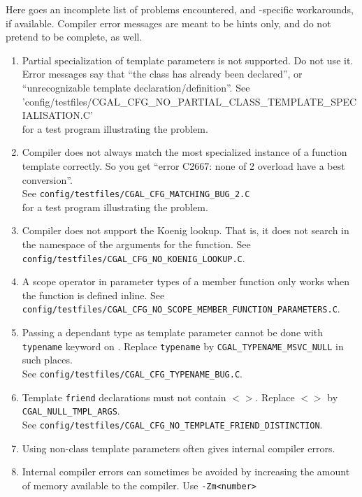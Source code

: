 Here goes an incomplete list of problems encountered, and
\cgal-specific workarounds, if available.  Compiler error messages are
meant to be hints only, and do not pretend to be complete, as well.
\begin{enumerate}
%
\item Partial specialization of template parameters is not
supported. Do not use it. Error messages say that ``the class has
already been declared'', or ``unrecognizable template
declaration/definition''. See
\nonlinkedpath'config/testfiles/CGAL_CFG_NO_PARTIAL_CLASS_TEMPLATE_SPECIALISATION.C'\\
 for a test program illustrating the problem. \label{msvc::parspec}
%
\item Compiler does not always match the most
specialized instance of a function template correctly. So you get
``error C2667: none of 2 overload have a best conversion''.\\
See \texttt{config/testfiles/CGAL\_CFG\_MATCHING\_BUG\_2.C} \\
for a test program illustrating the problem.\label{msvc::matchbug2}
%
\item Compiler does not support the Koenig
lookup. That is, it does not search in the namespace of the arguments for
the function. See
\texttt{config/testfiles/CGAL\_CFG\_NO\_KOENIG\_LOOKUP.C}. \label{msvc::koenig}
%
\item A scope operator in  parameter types of a member function only
works when the function is defined inline. See
\texttt{config/testfiles/CGAL\_CFG\_NO\_SCOPE\_MEMBER\_FUNCTION\_PARAMETERS.C}. 
\label{msvc::scopememberfunc}
%
\item Passing a dependant type as template parameter cannot be done
with \texttt{typename} keyword on \msvc. Replace \texttt{typename}
by \texttt{CGAL\_TYPENAME\_MSVC\_NULL} in such places.\\ 
See \texttt{config/testfiles/CGAL\_CFG\_TYPENAME\_BUG.C}. \label{msvc::typename}
%
\item Template \texttt{friend} declarations must not contain $<>$.
Replace $<>$  by \texttt{CGAL\_NULL\_TMPL\_ARGS}.\\
See \texttt{config/testfiles/CGAL\_CFG\_NO\_TEMPLATE\_FRIEND\_DISTINCTION}.
\label{msvc::friend}
%
\item Using non-class template parameters often gives internal
  compiler errors.
%
\item Internal compiler errors can sometimes be avoided by increasing
  the amount of memory available to the compiler. Use \texttt{-Zm<number>}

\end{enumerate}
